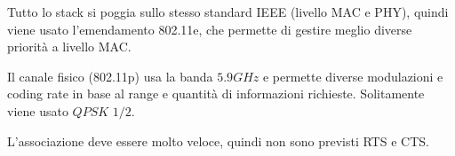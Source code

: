 Tutto lo stack si poggia sullo stesso standard IEEE (livello MAC e PHY), quindi viene usato l'emendamento 802.11e, che permette di gestire meglio diverse priorità a livello MAC.

Il canale fisico (802.11p) usa la banda $5.9GHz$ e permette diverse modulazioni e coding rate in base al range e quantità di informazioni richieste. Solitamente viene usato $QPSK$ $1/2$.

L'associazione deve essere molto veloce, quindi non sono previsti RTS e CTS.

